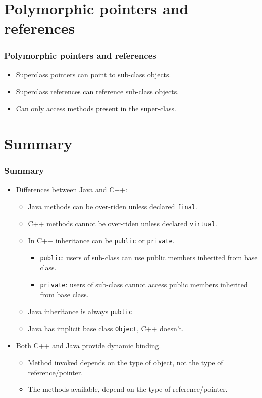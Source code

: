 \documentclass{beamer}
\begin{document}
\section{Polymorphic pointers and references}
\begin{frame}
\frametitle{Polymorphic pointers and references}
\begin{itemize}
\item Superclass pointers can point to sub-class objects.
\item Superclass references can reference sub-class objects.
\item Can only access methods present in the super-class.
\poly
\end{itemize}
\end{frame}
\section{Summary}
\begin{frame}
\frametitle{Summary}
\begin{itemize}
\item Differences between Java and C++:
\begin{itemize}
\item Java methods can be over-riden unless declared \texttt{final}.
\item C++ methods cannot be over-riden unless declared \texttt{virtual}.
\item In C++ inheritance can be \texttt{public} or \texttt{private}.
\begin{itemize}
\item \texttt{public}: users of sub-class can use public members inherited from base class.
\item \texttt{private}: users of sub-class cannot access public members inherited from base class.
\end{itemize}
\item Java inheritance is always \texttt{public}
\item Java has implicit base class \texttt{Object}, C++ doesn't.
\end{itemize}
\item Both C++ and Java provide dynamic binding.
\begin{itemize}
\item Method invoked depends on the type of object, not the type of reference/pointer.
\item The methods available, depend on the type of reference/pointer.
\end{itemize}
\end{itemize}
\end{frame}
\end{document}

